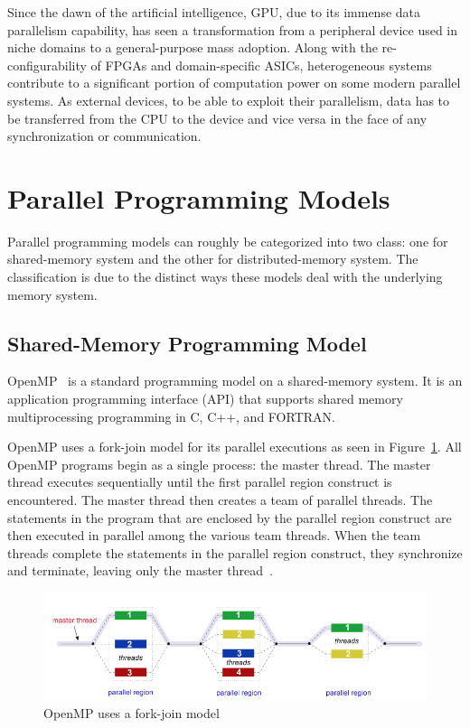 Since the dawn of the artificial intelligence, GPU, due to its immense data 
parallelism capability, has seen a transformation from a peripheral device used 
in niche domains to a general-purpose mass adoption. Along with the 
re-configurability of FPGAs and domain-specific ASICs, heterogeneous systems 
contribute to a significant portion of computation power on some modern parallel 
systems. As external devices, to be able to exploit their parallelism, data has 
to be transferred from the CPU to the device and vice versa in the face of any 
synchronization or communication. 

\section{Parallel Programming Models}
\label{sec:ppm}
Parallel programming models can roughly be categorized into two class: one for 
shared-memory system and the other for distributed-memory system. The 
classification is due to the distinct ways these models deal with the 
underlying memory system.

\subsection{Shared-Memory Programming Model}
OpenMP~\cite{openmp, OpenMP4.0} is a standard programming model on a 
shared-memory system. It is an application programming interface (API) that 
supports shared memory multiprocessing programming in C, C++, and FORTRAN.

OpenMP uses a fork-join model for its parallel executions as seen in 
Figure~\ref{fig:fork-join}.
All OpenMP programs begin as a single process: the master thread. The master 
thread executes sequentially until the first parallel region construct is 
encountered. The master thread then creates a team of parallel threads.
The statements in the program that are enclosed by the parallel region construct 
are then executed in parallel among the various team threads. When the team 
threads complete the statements in the parallel region construct, they 
synchronize and terminate, leaving only the master thread~\cite{llnl_openmp}.
\begin{figure}[H]
    \centerline{\includegraphics[scale=0.50]{background/figs/fork_join.png}}
    \caption{OpenMP uses a fork-join model}
    \label{fig:fork-join}
\end{figure}

